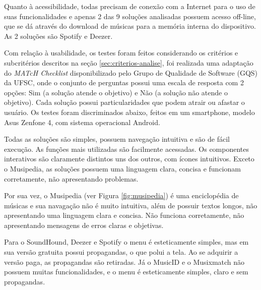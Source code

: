 
Quanto à acessibilidade, todas precisam de conexão com a Internet para o uso de suas funcionalidades e apenas 2 das 9 soluções analisadas possuem acesso off-line, que se dá através do download de músicas para a memória interna do dispositivo. As 2 soluções são Spotify e Deezer.

Com relação à usabilidade, os testes foram feitos considerando os critérios e subcritérios descritos na seção \ref{sec:criterios-analise}, foi realizada uma adaptação do \textit{MATcH Checklist} disponibilizado pelo Grupo de Qualidade de Software (GQS) da UFSC, onde o conjunto de perguntas possui uma escala de resposta com 2 opções: Sim (a solução atende o objetivo) e Não (a solução não atende o objetivo). Cada solução possui particularidades que podem atrair ou afastar o usuário. Os testes foram discriminados abaixo, feitos em um smartphone, modelo Asus Zenfone 4, com sistema operacional Android.



Todas as soluções são simples, possuem navegação intuitiva e são de fácil execução. As funções mais utilizadas são facilmente acessadas. Os componentes interativos são claramente distintos uns dos outros, com ícones intuitivos. Exceto o Musipedia, as soluções possuem uma linguagem clara, concisa e funcionam corretamente, não apresentando problemas. 

Por sua vez, o Musipedia (ver Figura \ref{fig:musipedia}) é uma enciclopédia de músicas e sua navagação não é muito intuitiva, além de possuir textos longos, não apresentando uma linguagem clara e concisa. Não funciona corretamente, não apresentando mensagens de erros claras e objetivas.

Para o SoundHound, Deezer e Spotify o menu é esteticamente simples, mas em sua versão gratuita possui propagandas, o que polui a tela. Ao se adquirir a versão paga, as propagandas são retiradas. Já o MusicID e o Musixmatch não possuem muitas funcionalidades, e o menu é esteticamente simples, claro e sem propagandas.

